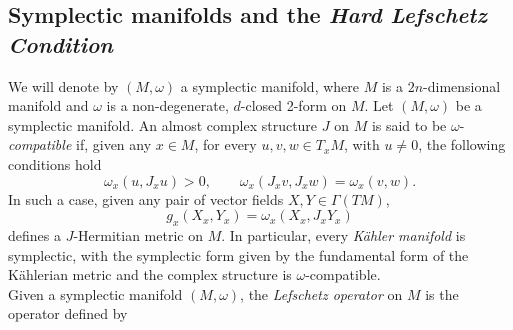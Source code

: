 \documentclass[a4paper, 11pt]{amsart}
\theoremstyle{plain}
\theoremstyle{definition}
\numberwithin{equation}{section}
\begin{document}
{\subsection{Symplectic manifolds and the \textit{Hard Lefschetz Condition}} We will denote by $(M, \omega)$ a symplectic manifold, where $M$ is a $2n$-dimensional manifold and $\omega$ is a non-degenerate, $d$-closed 2-form on $M$. Let $(M,\omega)$ be a symplectic manifold. An almost complex structure $J$ on $M$ is said to be $\omega$-{\em compatible} if, given any $x\in M$, for every $u,v,w\in T_xM$, with $u\neq 0$, the following conditions hold 
$$
\omega_x(u, J_xu) > 0,\qquad
\omega_x(J_xv,J_xw) = \omega_x(v,w).
$$
In such a case, given any pair of vector fields $X,Y\in\Gamma(TM)$, 
$$g_x(X_x,Y_x) = \omega_x(X_x, J_xY_x)$$ defines a $J$-Hermitian metric on $M$.
In particular, every \textit{K\"ahler manifold} is symplectic, with the symplectic form given by the fundamental form of the K\"ahlerian metric and the complex structure is $\omega$-compatible.\\[5pt]
Given a symplectic manifold $(M, \omega)$, the \textit{Lefschetz operator} on $M$ is the operator defined by

}
\end{document}
